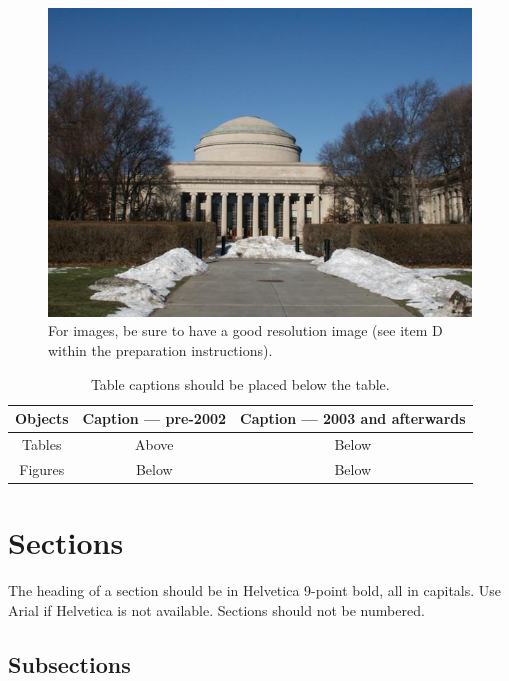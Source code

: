 \documentclass{sigchi}
\newcommand\tabhead[1]{\small\textbf{#1}}
\begin{document}
\begin{figure}[!t]
\centering
\includegraphics[width=0.9\columnwidth]{Figure1}
\caption{For images, be sure to have a good resolution image
  (see item D within the preparation instructions).}
\label{fig:figure1}
\end{figure}


\begin{table}[!b]
  \centering
  \begin{tabular}{|c|c|c|}
    \hline
    \tabhead{Objects} &
    \multicolumn{1}{|p{0.3\columnwidth}|}{\centering\tabhead{Caption --- pre-2002}} &
    \multicolumn{1}{|p{0.4\columnwidth}|}{\centering\tabhead{Caption --- 2003 and afterwards}} \\
    \hline
    Tables & Above & Below \\
    \hline
    Figures & Below & Below \\
    \hline
  \end{tabular}
  \caption{Table captions should be placed below the table.}
  \label{tab:table1}
\end{table}

\section{Sections}

The heading of a section should be in Helvetica 9-point bold, all in
capitals. Use Arial if Helvetica is not available. Sections should
not be numbered.

\subsection{Subsections}
\end{document}
